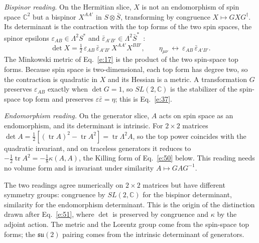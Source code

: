 \documentclass[10pt]{article}
\newcommand{\tr}{\operatorname{tr}}
\begin{document}
\emph{Bispinor reading.} On the Hermitian slice, $X$ is not an endomorphism of spin space $\mathbb C^2$ but a bispinor $X^{AA'}$ in $S\otimes\bar S$, transforming by congruence $X\mapsto GXG^\dagger$. Its determinant is the contraction with the top forms of the two spin spaces, the spinor epsilons $\varepsilon_{AB}\in\Lambda^2S^*$ and $\bar\varepsilon_{A'B'}\in\Lambda^2\bar S^*$~\cite{penrose}:
\begin{equation*}
\det X=\tfrac12\,\varepsilon_{AB}\,\bar\varepsilon_{A'B'}\,X^{AA'}X^{BB'},\qquad \eta_{\mu\nu}\ \longleftrightarrow\ \varepsilon_{AB}\,\bar\varepsilon_{A'B'} .
\end{equation*}
The Minkowski metric of Eq.~\eqref{e:17} is the product of the two spin-space top forms. Because spin space is two-dimensional, each top form has degree two, so the contraction is quadratic in $X$ and its Hessian is a metric. A transformation $G$ preserves $\varepsilon_{AB}$ exactly when $\det G=1$, so $SL(2,\mathbb C)$ is the stabilizer of the spin-space top form and preserves $\varepsilon\bar\varepsilon=\eta$; this is Eq.~\eqref{e:37}.

\emph{Endomorphism reading.} On the generator slice, $A$ acts on spin space as an endomorphism, and its determinant is intrinsic. For $2\times2$ matrices $\det A=\tfrac12[(\tr A)^2-\tr A^2]=\tr\Lambda^2A$, so the top power coincides with the quadratic invariant, and on traceless generators it reduces to $-\tfrac12\tr A^2=-\tfrac18\kappa(A,A)$, the Killing form of Eq.~\eqref{e:50} below. This reading needs no volume form and is invariant under similarity $A\mapsto GAG^{-1}$.

The two readings agree numerically on $2\times2$ matrices but have different symmetry groups: congruence by $SL(2,\mathbb C)$ for the bispinor determinant, similarity for the endomorphism determinant. This is the origin of the distinction drawn after Eq.~\eqref{e:51}, where $\det$ is preserved by congruence and $\kappa$ by the adjoint action. The metric and the Lorentz group come from the spin-space top forms; the $\mathfrak{su}(2)$ pairing comes from the intrinsic determinant of generators.
\end{document}
